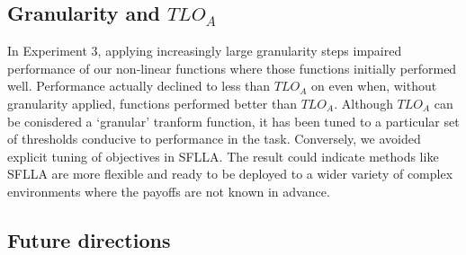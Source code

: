 



\subsection{Granularity and $TLO_A$}

In Experiment 3, applying increasingly large granularity steps impaired performance of our non-linear functions where those functions initially performed well. Performance actually declined to less than $TLO_A$ on even when, without granularity applied, functions performed better than $TLO_A$. Although $TLO_A$ can be conisdered a `granular' tranform function, it has been tuned to a particular set of thresholds conducive to performance in the task. Conversely, we avoided explicit tuning of objectives in SFLLA. The result could indicate methods like SFLLA are more flexible and ready to be deployed to a wider variety of complex environments where the payoffs are not known in advance.

\subsection{Future directions}

